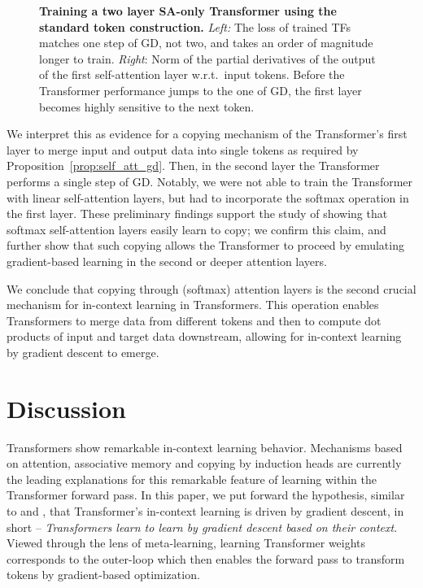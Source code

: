 \documentclass{article}
\theoremstyle{plain}
\theoremstyle{definition}
\theoremstyle{remark}
\begin{document}
\begin{figure}[H]
\begin{minipage}{.26\textwidth}
\begin{center}
  \end{center}
\end{minipage}
\hspace{-15pt}
\vspace{-8pt}
  \caption{\textbf{Training a two layer SA-only Transformer using the standard token construction.} \textit{Left:} The loss of trained TFs matches one step of GD, not two, and takes an order of magnitude longer to train. \textit{Right}: Norm of the partial derivatives of the output of the first self-attention layer w.r.t.~input tokens. Before the Transformer performance jumps to the one of GD, the first layer becomes highly sensitive to the next token.}
  \label{fig:copy}
  \vspace{-10pt}
\end{figure}


We interpret this as evidence for a copying mechanism of the Transformer's first layer to merge input and output data into single tokens as required by Proposition~\ref{prop:self_att_gd}. Then, in the second layer the Transformer performs a single step of GD. Notably, we were not able to train the Transformer with linear self-attention layers, but had to incorporate the softmax operation in the first layer. These preliminary findings support the study of \citet{induction_heads} showing that softmax self-attention layers easily learn to copy; we confirm this claim, and further show that such copying allows the Transformer to proceed by emulating gradient-based learning in the second or deeper attention layers.

We conclude that copying through (softmax) attention layers is the second crucial mechanism for in-context learning in Transformers. This operation enables Transformers to merge data from different tokens and then to compute dot products of input and target data downstream, allowing for in-context learning by gradient descent to emerge. 

\section{Discussion}

Transformers show remarkable in-context learning behavior. Mechanisms based on attention, associative memory and copying by induction heads are currently the leading explanations for this remarkable feature of learning within the Transformer forward pass. In this paper, we put forward the hypothesis, similar to \citet{simple_case_study} and \citet{related_work}, that Transformer's in-context learning is driven by gradient descent, in short -- \textit{Transformers learn to learn by gradient descent based on their context}. Viewed through the lens of meta-learning, learning Transformer weights corresponds to the outer-loop which then enables the forward pass to transform tokens by gradient-based optimization. 
\end{document}
